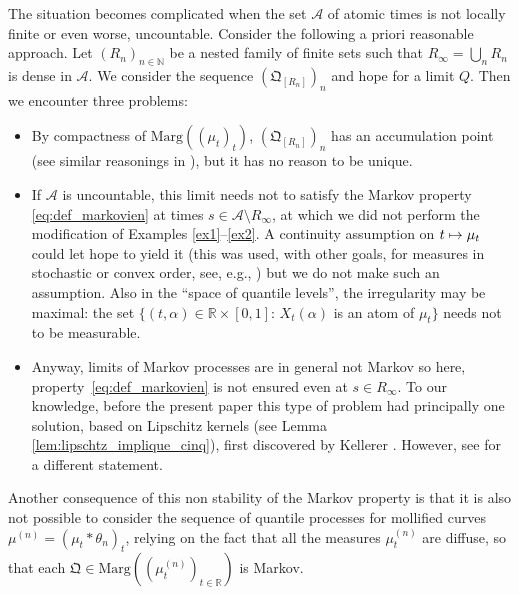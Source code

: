 \documentclass[11pt]{article}
\newcommand\mto{\mathchoice{\longmapsto}{\mapsto}{\mapsto}{\mapsto}}
\theoremstyle{plain}
\theoremstyle{definition}
\newcommand{\como}{\mathfrak{Q}}
\newcommand{\A}{{\mathcal A}}
\newcommand{\ma}{\mathrm{Marg}}
\newcommand{\R}{\mathbb{R}}
\newcommand{\N}{\mathbb{N}}
\begin{document}
The situation becomes complicated when the set $\A$ of atomic times is not locally finite or even worse, uncountable. Consider the following a priori reasonable approach. Let $(R_n)_{n\in \N}$ be a nested family of finite sets such that $R_\infty=\bigcup_n R_n$ is dense in $\A$. We consider the sequence $(\como_{[R_n]})_n$ \label{page:tentative_limite} and hope for a limit $Q$. Then we encounter three problems:
\begin{itemize}
\item
By compactness of $\ma((\mu_t)_t)$, $(\como_{[R_n]})_n$ has an accumulation point (see similar reasonings in \cite{HiRo13,Ju_ejp,KaKr,Lis,Vi2}), but it has no reason to be unique.

\item
If $\A$ is uncountable, this limit needs not to satisfy the Markov property \eqref{eq:def_markovien} at times $s\in\A\setminus R_\infty$, at which we did not perform the modification of Examples \ref{ex1}--\ref{ex2}. A continuity assumption on $t\mto \mu_t$ could let hope to yield it (this was used, with other goals, for measures in stochastic or convex order, see, e.g., \cite{BHS,HiRoYo14}) but we do not make such an assumption. Also in the ``space of quantile levels'', the irregularity may be maximal: the set $\{(t,\alpha)\in\R\times[0,1]:\,X_t(\alpha)$ is an atom of $\mu_t\}$ needs not to be measurable.

\item
Anyway, limits of Markov processes are in general not Markov so here, property~\eqref{eq:def_markovien} is not ensured even at $s\in R_\infty$. To our knowledge, before the present paper this type of problem had principally one solution, based on Lipschitz kernels (see Lemma \ref{lem:lipschtz_implique_cinq}), first discovered by Kellerer \cite{Ke72,Low,HiRoYo14,BeJu16, BHS}. However, see \cite[Lem.\,5.3]{Naga} for a different statement.
\end{itemize}
Another consequence of this non stability of the Markov property is that it is also not possible to consider the sequence of quantile processes for mollified curves $\mu^{(n)}=(\mu_t\ast \theta_n)_t$, relying on the fact that all the measures $\mu_t^{(n)}$ are diffuse, so that each $\como\in\ma((\mu^{(n)}_t)_{t\in\R})$ is Markov.\enlargethispage{.5\baselineskip}%
\end{document}
